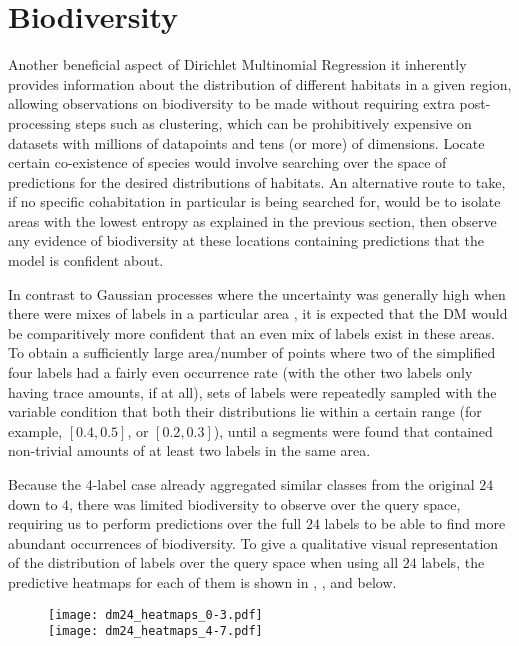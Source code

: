 \pagebreak
\section{Biodiversity}

Another beneficial aspect of Dirichlet Multinomial Regression it inherently provides information about the distribution of different habitats in a given region, allowing observations on biodiversity to be made without requiring extra post-processing steps such as clustering, which can be prohibitively expensive on datasets with millions of datapoints and tens (or more) of dimensions. Locate certain co-existence of species would involve searching over the space of predictions for the desired distributions of habitats. An alternative route to take, if no specific cohabitation in particular is being searched for, would be to isolate areas with the lowest entropy as explained in the previous section, then observe any evidence of biodiversity at these locations containing predictions that the model is confident about.

In contrast to Gaussian processes where the uncertainty  was generally high when there were mixes of labels in a particular area , it is expected that the DM would be comparitively more confident that an even mix of labels exist in these areas. To obtain a sufficiently large area/number of points where two of the simplified four labels had a fairly even occurrence rate (with the other two labels only having trace amounts, if at all), sets of labels were repeatedly sampled with the variable condition that both their distributions lie within a certain range (for example, $[0.4, 0.5]$, or $[0.2, 0.3]$), until a segments were found that contained non-trivial amounts of at least two labels in the same area.

Because the 4-label case already aggregated similar classes from the original $24$ down to $4$, there was limited biodiversity to observe over the query space, requiring us to perform predictions over the full $24$ labels to be able to find more abundant occurrences of biodiversity. To give a qualitative visual representation of the distribution of labels over the query space when using all $24$ labels, the predictive heatmaps for each of them is shown in , , and  below.

\begin{figure}[H]
    \texttt{[image: dm24\_heatmaps\_0-3.pdf]}\\
    \texttt{[image: dm24\_heatmaps\_4-7.pdf]}
    \caption{}
    \label{fig:dm24_0-7}
\end{figure}

